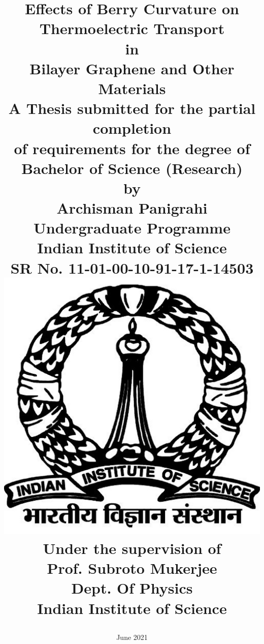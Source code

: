 \documentclass{report}
\begin{document}


%





\title{
	\sc
	\Huge{Effects of Berry Curvature on Thermoelectric Transport}\\
	\Large{in}\\
	\Huge{Bilayer Graphene and Other Materials}
	\\[30pt]
	\large{A Thesis submitted for the partial completion}
	\\[5pt]
	\large{of requirements for the degree of}
	\\[10pt]
	\Large{Bachelor of Science (Research)}
	\\[10pt]
	\normalsize{by}
	\\[10pt]
	\large{Archisman Panigrahi}
	\\[5pt]
	\normalsize{Undergraduate Programme}
	\\[5pt]
	\normalsize{Indian Institute of Science}
	\\[5pt]
	\normalsize{SR No.}
	\normalsize{11-01-00-10-91-17-1-14503}
	\\[10pt]
	\includegraphics[scale=0.12]{Logo.png}
	\\[10pt]
	\normalsize{Under the supervision of}
	\\[10pt]
	\large{Prof. Subroto Mukerjee}\\[5pt]
	\normalsize{Dept. Of Physics}\\[5pt]
	\normalsize{Indian Institute of Science}
	\date{June 2021}
}
\end{document}
